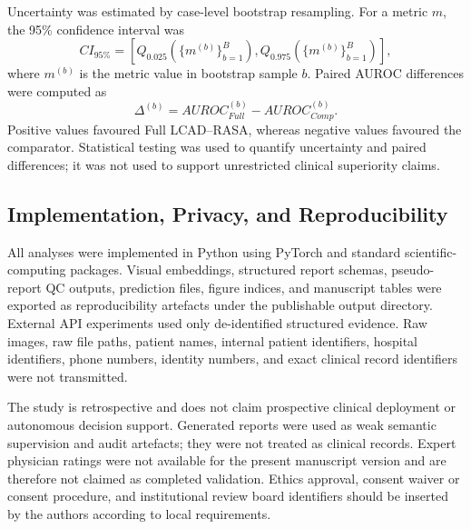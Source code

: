 Uncertainty was estimated by case-level bootstrap resampling. For a metric \(m\), the 95\% confidence interval was
\begin{equation}
CI_{95\%}
=
\left[
Q_{0.025}\left(\{m^{(b)}\}_{b=1}^{B}\right),
Q_{0.975}\left(\{m^{(b)}\}_{b=1}^{B}\right)
\right],
\end{equation}
where \(m^{(b)}\) is the metric value in bootstrap sample \(b\). Paired AUROC differences were computed as
\begin{equation}
\Delta^{(b)}
=
AUROC_{Full}^{(b)}
-
AUROC_{Comp}^{(b)}.
\end{equation}
Positive values favoured Full LCAD--RASA, whereas negative values favoured the comparator. Statistical testing was used to quantify uncertainty and paired differences; it was not used to support unrestricted clinical superiority claims.

\subsection{Implementation, Privacy, and Reproducibility}
\label{subsec:methods_implementation}

All analyses were implemented in Python using PyTorch and standard scientific-computing packages. Visual embeddings, structured report schemas, pseudo-report QC outputs, prediction files, figure indices, and manuscript tables were exported as reproducibility artefacts under the publishable output directory. External API experiments used only de-identified structured evidence. Raw images, raw file paths, patient names, internal patient identifiers, hospital identifiers, phone numbers, identity numbers, and exact clinical record identifiers were not transmitted.

The study is retrospective and does not claim prospective clinical deployment or autonomous decision support. Generated reports were used as weak semantic supervision and audit artefacts; they were not treated as clinical records. Expert physician ratings were not available for the present manuscript version and are therefore not claimed as completed validation. Ethics approval, consent waiver or consent procedure, and institutional review board identifiers should be inserted by the authors according to local requirements.
